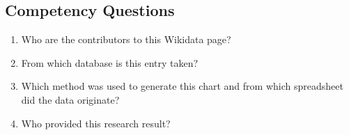 \subsection{Competency Questions}
\label{cqs:Provenance}
\begin{enumerate}[CQ1.]
\item Who are the contributors to this Wikidata page?
\item From which database is this entry taken?
\item Which method was used to generate this chart and from which spreadsheet did the data originate?
\item Who provided this research result?
\end{enumerate}

\newpage
